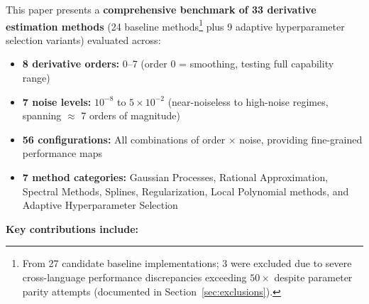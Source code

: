 This paper presents a \textbf{comprehensive benchmark of 33 derivative estimation methods} (24 baseline methods\footnote{From 27 candidate baseline implementations; 3 were excluded due to severe cross-language performance discrepancies exceeding $50\times$ despite parameter parity attempts (documented in Section~\ref{sec:exclusions}).} plus 9 adaptive hyperparameter selection variants) evaluated across:
\begin{itemize}
    \item \textbf{8 derivative orders:} 0--7 (order 0 = smoothing, testing full capability range)
    \item \textbf{7 noise levels:} $10^{-8}$ to $5 \times 10^{-2}$ (near-noiseless to high-noise regimes, spanning $\approx$ 7 orders of magnitude)
    \item \textbf{56 configurations:} All combinations of order $\times$ noise, providing fine-grained performance maps
    \item \textbf{7 method categories:} Gaussian Processes, Rational Approximation, Spectral Methods, Splines, Regularization, Local Polynomial methods, and Adaptive Hyperparameter Selection
\end{itemize}

\textbf{Key contributions include:}

